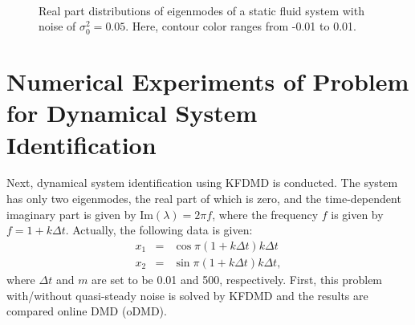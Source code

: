 \documentclass[aip,graphicx]{revtex4-1}
\begin{document}
\begin{figure}
	\\
	\\
	\\
	\caption{Real part distributions of eigenmodes of a static fluid system with noise of $\sigma_0^2=0.05$. Here, contour color ranges from -0.01 to 0.01.}
	\label{fig:cyl_eigenmodewnoise}
\end{figure}

\section{Numerical Experiments of Problem for Dynamical System Identification}
\label{sec:NDSI}
Next, dynamical system identification using KFDMD is conducted. The system has only two eigenmodes, the real part of which is zero, and the time-dependent imaginary part is given by $\mathrm{Im}(\lambda) = 2\pi f$,
where the frequency $f$ is given by $f = 1 + k\Delta t$. Actually, the following data is given:
\begin{eqnarray}
x_1&=&\cos{\pi(1+k\Delta t) k\Delta t}\\
x_2&=&\sin{\pi(1+k\Delta t) k\Delta t},
\end{eqnarray}
where $\Delta t$ and $m$ are set to be 0.01 and 500, respectively.
First, this problem with/without quasi-steady noise is solved by KFDMD and the results are compared online DMD (oDMD). 
\end{document}
